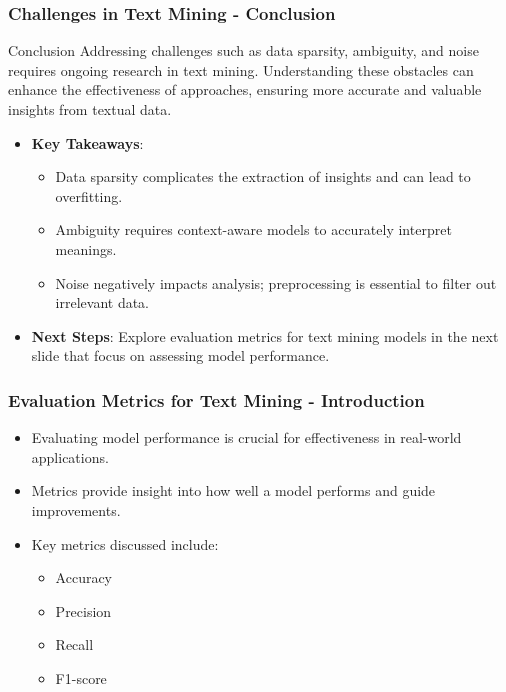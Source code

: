 \documentclass[aspectratio=169]{beamer}
\begin{document}
\begin{frame}[fragile]
    \frametitle{Challenges in Text Mining - Conclusion}
    \begin{block}{Conclusion}
        Addressing challenges such as data sparsity, ambiguity, and noise requires ongoing research in text mining. Understanding these obstacles can enhance the effectiveness of approaches, ensuring more accurate and valuable insights from textual data.
    \end{block}

    \begin{itemize}
        \item \textbf{Key Takeaways}:
        \begin{itemize}
            \item Data sparsity complicates the extraction of insights and can lead to overfitting.
            \item Ambiguity requires context-aware models to accurately interpret meanings.
            \item Noise negatively impacts analysis; preprocessing is essential to filter out irrelevant data.
        \end{itemize}
        \item \textbf{Next Steps}: Explore evaluation metrics for text mining models in the next slide that focus on assessing model performance.
    \end{itemize}
\end{frame}

\begin{frame}[fragile]
    \frametitle{Evaluation Metrics for Text Mining - Introduction}
    \begin{itemize}
        \item Evaluating model performance is crucial for effectiveness in real-world applications.
        \item Metrics provide insight into how well a model performs and guide improvements.
        \item Key metrics discussed include:
        \begin{itemize}
            \item Accuracy
            \item Precision
            \item Recall
            \item F1-score
        \end{itemize}
    \end{itemize}
\end{frame}
\end{document}
